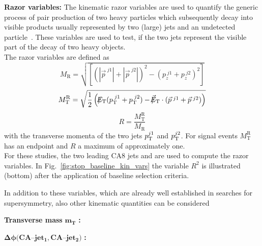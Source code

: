 \begin{description}
 \item \textbf{Razor variables:} The kinematic razor variables are used to quantify the generic process of pair production of two heavy particles which subsequently decay into visible products usually represented by two (large) jets and an undetected particle~\cite{Chatrchyan:2012uea, Chatrchyan:2014goa, CMS-PAS-SUS-14-011}. These variables are used to test, if the two jets represent the visible part of the decay of two heavy objects. \\
The razor variables are defined as
\begin{equation}
M_\mathrm{R} = \sqrt{\left[(|\vec{p}^{\; j1} | + |\vec{p}^{\; j2} |)^2 - (p_z^{\; j1}  + p_z^{\; j2} )^2 \right]}
\end{equation}
 \begin{equation}
M_\mathrm{T}^\mathrm{R} = \sqrt{\frac{1}{2} \left( \slash\mkern-12mu{E}_{\text{T}} (p_{\text{T}}^{\; j1}  + p_{\text{T}}^{\; j2} ) - \slash\mkern-12mu{\vec{E}}_{\text{T}} \cdot (\vec{p}^{\; j1} + \vec{p}^{\; j2}) \right) }
\end{equation}
\begin{equation}
R = \frac{M_\mathrm{T}^\mathrm{R}}{M_\mathrm{R}}
\end{equation}
with the transverse momenta of the two jets $p_{\text{T}}^{j1}$ and $p_{\text{T}}^{j2}$. For signal events $M_\mathrm{T}^\mathrm{R}$ has an endpoint and $R$ a maximum of approximately one. \\
For these studies, the two leading CA8 jets and \met are used to compute the razor variables. In Fig.~\ref{fig:stop_baseline_kin_vars} the variable $R^2$ is illustrated (bottom) after the application of baseline selection criteria. 
\end{description} 
In addition to these variables, which are already well established in searches for supersymmetry, also other kinematic quantities can be considered
\begin{description}
 \item \textbf{Transverse mass} $\mathbf{m_T}$ \textbf{:}
 \item $\mathbf{\Delta \phi(CA}$--$\mathbf{jet_1, CA}$--$\mathbf{jet_2)}$ \textbf{:}
\end{description}
 
